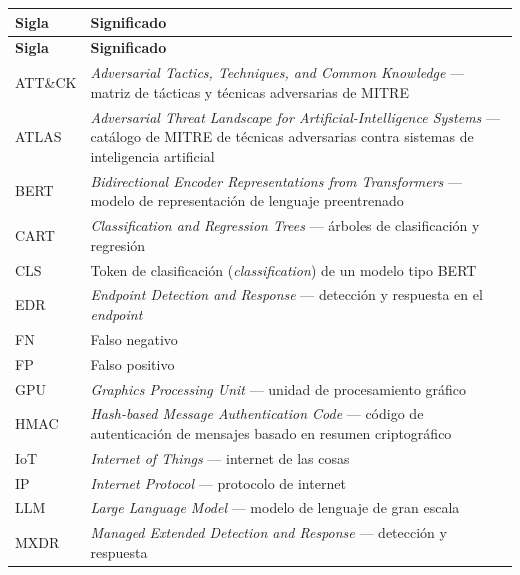 

\begin{longtable}{@{}p{}p{}@{}}
\toprule
\textbf{Sigla} & \textbf{Significado} \\
\midrule
\endfirsthead
\toprule
\textbf{Sigla} & \textbf{Significado} \\
\midrule
\endhead
\bottomrule
\endfoot

ATT\&CK  & \textit{Adversarial Tactics, Techniques, and Common Knowledge} --- matriz de
           tácticas y técnicas adversarias de MITRE \\
ATLAS    & \textit{Adversarial Threat Landscape for Artificial-Intelligence Systems} ---
           catálogo de MITRE de técnicas adversarias contra sistemas de inteligencia artificial \\
BERT     & \textit{Bidirectional Encoder Representations from Transformers} --- modelo de
           representación de lenguaje preentrenado \\
CART     & \textit{Classification and Regression Trees} --- árboles de clasificación y regresión \\
CLS      & Token de clasificación (\textit{classification}) de un modelo tipo BERT \\
EDR      & \textit{Endpoint Detection and Response} --- detección y respuesta en el
           \textit{endpoint} \\
FN       & Falso negativo \\
FP       & Falso positivo \\
GPU      & \textit{Graphics Processing Unit} --- unidad de procesamiento gráfico \\
HMAC     & \textit{Hash-based Message Authentication Code} --- código de autenticación de
           mensajes basado en resumen criptográfico \\
IoT      & \textit{Internet of Things} --- internet de las cosas \\
IP       & \textit{Internet Protocol} --- protocolo de internet \\
LLM      & \textit{Large Language Model} --- modelo de lenguaje de gran escala \\
MXDR     & \textit{Managed Extended Detection and Response} --- detección y respuesta

\end{longtable}
